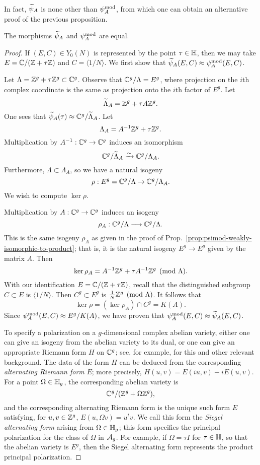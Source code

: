 \documentclass{amsart}
\begin{document}
In fact, $\widetilde{\psi}_{A}$ is none other than $\psi_{A}^\mathrm{mod}$, from which one can obtain an alternative proof of the previous proposition.
\begin{proposition}
  The morphisms $\widetilde{\psi}_{A}$ and $\psi_{A}^\mathrm{mod}$ are equal.
\end{proposition}

\begin{proof}
  If $(E, C) \in Y_0(N)$ is represented by the point $\tau \in \mathbb{H}$, then we may take $E = \mathbb{C}/(\mathbb{Z} + \tau \mathbb{Z})$ and $C = \langle 1/N \rangle$. We first show that $\widetilde{\psi}_{A}(E,C) \approx \psi_{A}^\mathrm{mod}(E,C)$.

  Let $\Lambda = \mathbb{Z}^g + \tau \mathbb{Z}^g \subset \mathbb{C}^g$. Observe that $\mathbb{C}^g/\Lambda = E^g$, where projection on the $i$th complex coordinate is the same as projection onto the $i$th factor of $E^g$. Let
  \[
    \widetilde{\Lambda}_A = \mathbb{Z}^g + \tau A \mathbb{Z}^g.
  \]
  One sees that $\widetilde{\psi}_{A}(\tau) \approx \mathbb{C}^g/\widetilde{\Lambda}_A$. Let
  \[
    \Lambda_A = A^{-1}\mathbb{Z}^g + \tau \mathbb{Z}^g.
  \]
  Multiplication by $A^{-1}: \mathbb{C}^g \to \mathbb{C}^g$ induces an isomorphism
  \[
    \mathbb{C}^g/\widetilde{\Lambda}_A \xrightarrow{\sim} \mathbb{C}^g/\Lambda_A.
  \]
  Furthermore, $\Lambda \subset \Lambda_A$, so we have a natural isogeny
  \[
    \rho: E^g = \mathbb{C}^g/\Lambda \to \mathbb{C}^g/\Lambda_A.
  \]
  We wish to compute $\ker \rho$.

  Multiplication by $A: \mathbb{C}^g \to \mathbb{C}^g$ induces an isogeny
  \[
    \rho_A: \mathbb{C}^g/\Lambda \longrightarrow \mathbb{C}^g/\Lambda.
  \]
  This is the same isogeny $\rho_A$ as given in the proof of Prop.~\ref{prop:psimod-weakly-isomorphic-to-product}; that is, it is the natural isogeny $E^g \to E^g$ given by the matrix $A$. Then
\[
\ker \rho_A = A^{-1}\mathbb{Z}^g + \tau A^{-1} \mathbb{Z}^g \pmod{\Lambda}.
\]
With our identification $E = \mathbb{C}/(\mathbb{Z} + \tau\mathbb{Z})$, recall that the distinguished subgroup $C \subset E$ is $\langle 1/N \rangle$. Then $C^g \subset E^g$ is $\frac{1}{N}\mathbb{Z}^g \pmod{\Lambda}$. It follows that
\[
\ker \rho = (\ker \rho_A) \cap C^g = K(A).
\]
Since $\psi_{A}^\mathrm{mod}(E,C) \approx E^g/K(A)$, we have proven that $\psi_{A}^\mathrm{mod}(E,C) \approx \widetilde{\psi}_{A}(E,C)$.

  To specify a polarization on a $g$-dimensional complex abelian variety, either one can give an isogeny from the abelian variety to its dual, or one can give an appropriate Riemann form $H$ on $\mathbb{C}^g$; see, for example, \cite{rosen-avc} for this and other relevant background. The data of the form $H$ can be deduced from the corresponding \emph{alternating Riemann form} $E$; more precisely, $H(u,v) = E(iu,v) + i E(u,v)$. For a point $\Omega \in \mathbb{H}_g$, the corresponding abelian variety is
\[
\mathbb{C}^g/(\mathbb{Z}^g + \Omega \mathbb{Z}^g),
\]
and the corresponding alternating Riemann form is the unique such form $E$ satisfying, for $u,v \in \mathbb{Z}^g$, $E(u,\Omega v) = u^tv$. We call this form the \emph{Siegel alternating form} arising from $\Omega \in \mathbb{H}_g$; this form specifies the principal polarization for the class of $\Omega$ in $\mathcal{A}_g$. For example, if $\Omega = \tau I$ for $\tau \in \mathbb{H}$, so that the abelian variety is $E^g$, then the Siegel alternating form represents the product principal polarization.


\end{proof}
\end{document}

